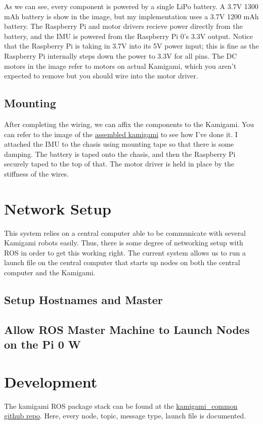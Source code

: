 \documentclass[11pt]{article}
\begin{document}
As we can see, every component is powered by a single LiPo battery. A 3.7V 1300 mAh battery is show in the image, but my implementation uses a 3.7V 1200 mAh battery. The Raspberry Pi and motor drivers recieve power directly from the battery, and the IMU is powered from the Raspberry Pi 0's 3.3V output. Notice that the Raspberry Pi is taking in 3.7V into its 5V power input; this is fine as the Raspberry Pi internally steps down the power to 3.3V for all pins. The DC motors in the image refer to motors on actual Kamigami, which you aren't expected to remove but you should wire into the motor driver.

\subsection{Mounting}
After completing the wiring, we can affix the components to the Kamigami. You can refer to the image of the \hyperref[fig:kamigami]{assembled kamigami} to see how I've done it. 
I attached the IMU to the chasis using mounting tape so that there is some damping. The battery is taped onto the chasis, and then the Raspberry Pi securely taped to the top of that. The motor driver is held in place by the stiffness of the wires.

\section{Network Setup}
This system relies on a central computer able to be communicate with several Kamigami robots easily. Thus, there is some degree of networking setup with ROS in order to get this working right. The current system allows us to run a launch file on the central computer that starts up nodes on both the central computer and the Kamigami.

\subsection{Setup Hostnames and Master}

\subsection{Allow ROS Master Machine to Launch Nodes on the Pi 0 W}

\section{Development}

The kamigami ROS package stack can be found at the \href{https://github.com/BML-MultiRobot/kamigami_common}{kamigami\_common github repo}. Here, every node, topic, message type, launch file is documented.
\end{document}
